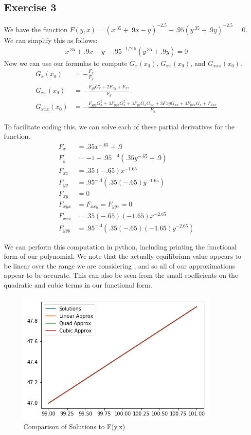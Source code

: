 \documentclass{article}
\begin{document}
	\subsection*{Exercise 3}
	We have the function $F(y,x) = (x^{.35} + .9x - y)^{-2.5} - .95(y^{.35} + .9y)^{-2.5} = 0$. We can simplify this as follows:
	\begin{align*}
	x^{.35} + .9x - y - .95^{-1/2.5}(y^{.35} + .9y) = 0
	\end{align*}
	Now we can use our formulas to compute $G_x(x_0)$, $G_{xx}(x_0)$, and $G_{xxx}(x_0)$. 
	\begin{align*}
	G_{x}(x_0) &= - \frac{F_x}{F_y} \\
	G_{xx}(x_0) &= - \frac{F_{yy} G_x^2 + 2 F_{xy} + F_{xx} }{F_{y}} \\
	G_{xxx}(x_0) &= - \frac{F_{yyy}G_x^2 + 3 F_{yyx} G_x^2 + 3 F_{yy} G_x G_{xx} + 3 F{xy} G_{xx} + 3 F_{yxx} G_x + F_{xxx} }{F_y}
	\end{align*}
	
	To facilitate coding this, we can solve each of these partial derivatives for the function.
	\begin{align*}
	F_{x} &= .35 x^{-.65} + .9 \\
	F_{y} &= -1 - .95^{-.4}(.35 y^{-.65} + .9) \\
	F_{xx} &= .35(-.65) x^{-1.65} \\
	F_{yy} &= .95^{-.4}(.35(-.65)y^{-1.65}) \\
	F_{xy} &= 0 \\
	F_{xyx} &= F_{xxy} = F_{yyx} = 0 \\
	F_{xxx} &= .35(-.65)(-1.65) x^{-2.65} \\
	F_{yyy} &= .95^{-.4}(.35(-.65)(-1.65)y^{-2.65})
	\end{align*}
	
	We can perform this computation in python, including printing the functional form of our polynomial. We note that the actually equilibrium value appears to be linear over the range we are considering , and so all of our approximations appear to be accurate. This can also be seen from the small coefficients on the quadratic and cubic terms in our functional form.
	
	\begin{figure}[!h]
		\centering
		\caption{Comparison of Solutions to F(y,x)}
		\includegraphics[scale = 0.5]{figP3}
	\end{figure}
	
\end{document}
